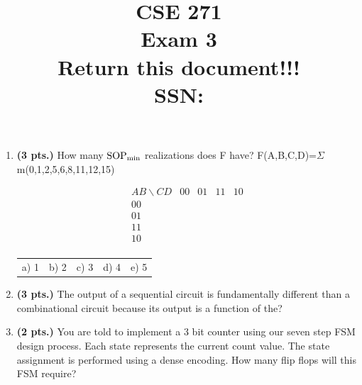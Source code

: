 \documentclass{article}
\begin{document}
\newcommand{\SOPmin}{${\rm SOP}_{\rm min} \ $}
\newcommand{\POSmin}{${\rm POS}_{\rm min} \ $}
\newcommand{\bs}{\backslash}
\newcommand{\x}{\addtocounter{enumi}{1} \theenumi}


\title{
\Huge{CSE 271}\\
\normalsize{Exam 3}\\
\normalsize{Return this document!!!}\\
SSN:}
\date{}

\maketitle{}

\begin{enumerate}
\item {\bf (3 pts.)} How many \SOPmin realizations does F have?
F(A,B,C,D)=$\Sigma$m(0,1,2,5,6,8,11,12,15)

$$ \begin{array} {c||c|c|c|c}
        AB \bs CD & 00 & 01 & 11 & 10 \\ \hline \hline
        00        &    &    &    &    \\ \hline
        01        &    &    &    &    \\ \hline
        11        &    &    &    &    \\ \hline
        10        &    &    &    &    \\
\end{array} $$ 

\begin{tabular}{p{0.75in}p{0.75in}p{0.75in}p{0.75in}p{0.75in}}
a) 1 & b) 2 & c) 3 & d) 4 & e) 5 \\
\end{tabular}

\item {\bf (3 pts.)} The output of a sequential circuit is fundamentally
different than a combinational circuit because its output is a function
of the?

\item {\bf (2 pts.)} You are told to implement a 3 bit counter using our seven
step FSM design process.  Each state represents the current count value.  The
state assignment is performed using a dense encoding. 
How many flip flops will this FSM require?


\end{enumerate}
\end{document}
